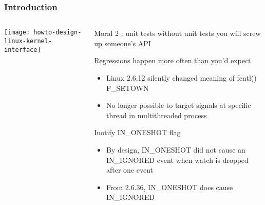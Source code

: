 \begin{frame}[plain]
	\frametitle{Introduction}
	
	
	
	\begin{columns}
		
		\begin{column}{.4\textwidth}
			
			\texttt{[image: howto-design-linux-kernel-interface]}
			
		\end{column}
		
		\begin{column}{.6\textwidth}
			\LARGE
			\begin{block}{Moral 2 : unit tests}
				without unit tests you
				will screw up someone’s API
			\end{block} 
			\normalsize
			Regressions happen more often
			than you’d expect
			
			\begin{itemize}
				\item Linux 2.6.12 silently changed meaning of fcntl() F\_SETOWN				
				\item No longer possible to target signals at specific thread in
				multithreaded process
			
			\end{itemize}
		
			Inotify IN\_ONESHOT flag
		
			\begin{itemize}
			\item By design, IN\_ONESHOT did not cause an IN\_IGNORED event
			when watch is dropped after one event
							
			\item From 2.6.36, IN\_ONESHOT does cause IN\_IGNORED
			
				
			\end{itemize}

		\end{column}
		
		
	\end{columns}
	
	
\end{frame}


